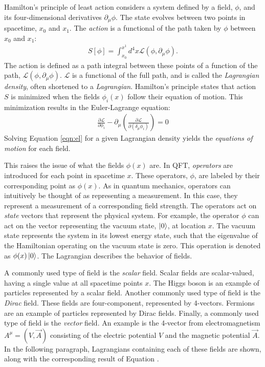 Hamilton's principle of least action considers a system defined by a field, $\phi$, and its four-dimensional derivatives $\partial_\mu\phi$.
The state evolves between two points in spacetime, $x_0$ and $x_1$.
The \emph{action} is a functional of the path taken by $\phi$ between $x_0$ and $x_1$:
\begin{equation}\begin{split}
S[\phi]=\int_{x_0}^{x^1} d^4x\mathcal{L}(\phi,\partial_\mu\phi).
\end{split}\end{equation}
The action is defined as a path integral between these points of a function of the path, $\mathcal{L}(\phi,\partial_\mu\phi)$.
$\mathcal{L}$ is a functional of the full path, and is called the \emph{Lagrangian density}, often shortened to a \emph{Lagrangian}.
Hamilton's principle states that action $S$ is minimized when the fields $\phi_i(x)$ follow their equation of motion.
This minimization results in the Euler-Lagrange equation:
\begin{equation}\begin{split}\label{eqn:el}
    \frac{\partial\mathcal{L}}{\partial\phi_i}-\partial_\mu\left(\frac{\partial\mathcal{L}}{\partial(\delta_\mu\phi_i)}\right)=0
\end{split}\end{equation} 
Solving Equation \ref{eqn:el} for a given Lagrangian density yields the \emph{equations of motion} for each field.

This raises the issue of what the fields $\phi(x)$ are.
In QFT, \emph{operators} are introduced for each point in spacetime $x$.
These operators, $\phi$, are labeled by their corresponding point as $\phi(x)$.
As in quantum mechanics, operators can intuitively be thought of as representing a measurement. In this case, they represent a measurement of a corresponding field strength.
The operators act on \emph{state} vectors that represent the physical system.
For example, the operator $\phi$ can act on the vector representing the vacuum state, $\ket{0}$, at location $x$.
The vacuum state represents the system in its lowest energy state, such that the eigenvalue of the Hamiltonian operating on the vacuum state is zero.
This operation is denoted as $\phi(x)\ket{0}$.
The Lagrangian describes the behavior of fields.

A commonly used type of field is the \emph{scalar} field.
Scalar fields are scalar-valued, having a single value at all spacetime points $x$.
The Higgs boson is an example of particles represented by a scalar field.
Another commonly used type of field is the \emph{Dirac} field.
These fields are four-component, represented by 4-vectors.
Fermions are an example of particles represented by Dirac fields.
Finally, a commonly used type of field is the \emph{vector} field.
An example is the 4-vector from electromagnetism $A^\mu=(V,\vec{A})$ consisting of the electric potential $V$ and the magnetic potential $\vec{A}$.
In the following paragraph, Lagrangians containing each of these fields are shown, along with the corresponding result of Equation \label{eqn:el}.


